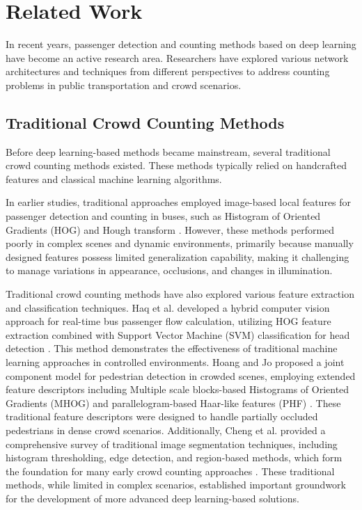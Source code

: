\clearpage
\section{Related Work}\label{section::relatedwork}


In recent years, passenger detection and counting methods based on deep learning have become an active research area. Researchers have explored various network architectures and techniques from different perspectives to address counting problems in public transportation and crowd scenarios.
\subsection{Traditional Crowd Counting Methods}
Before deep learning-based methods became mainstream, several traditional crowd counting methods existed. These methods typically relied on handcrafted features and classical machine learning algorithms.

In earlier studies, traditional approaches employed image-based local features for passenger detection and counting in buses, such as Histogram of Oriented Gradients (HOG) \cite{30_khan_passenger_2020} and Hough transform \cite{73_Huofu}. However, these methods performed poorly in complex scenes and dynamic environments, primarily because manually designed features possess limited generalization capability, making it challenging to manage variations in appearance, occlusions, and changes in illumination.

Traditional crowd counting methods have also explored various feature extraction and classification techniques. Haq et al. developed a hybrid computer vision approach for real-time bus passenger flow calculation, utilizing HOG feature extraction combined with Support Vector Machine (SVM) classification for head detection \cite{19_haq_fast_2020}. This method demonstrates the effectiveness of traditional machine learning approaches in controlled environments. Hoang and Jo proposed a joint component model for pedestrian detection in crowded scenes, employing extended feature descriptors including Multiple scale blocks-based Histograms of Oriented Gradients (MHOG) and parallelogram-based Haar-like features (PHF) \cite{21_hoang_joint_2016}. These traditional feature descriptors were designed to handle partially occluded pedestrians in dense crowd scenarios. Additionally, Cheng et al. provided a comprehensive survey of traditional image segmentation techniques, including histogram thresholding, edge detection, and region-based methods, which form the foundation for many early crowd counting approaches \cite{10_cheng_color_2001}. These traditional methods, while limited in complex scenarios, established important groundwork for the development of more advanced deep learning-based solutions.

